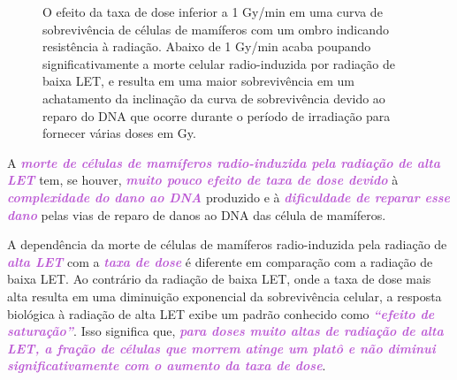 \documentclass[11pt,a4paper]{article}
\begin{document}
	\begin{figure}[h]
		\centering
		\caption{O efeito da taxa de dose inferior a 1 Gy/min em uma curva de sobrevivência de células de mamíferos com um ombro indicando resistência à radiação. Abaixo de 1 Gy/min acaba poupando significativamente a morte celular radio-induzida por radiação de baixa LET, e resulta em uma maior sobrevivência em um achatamento da inclinação da curva de sobrevivência devido ao reparo do DNA que ocorre durante o período de irradiação para fornecer várias doses em Gy.}
		\label{fig:efeitoTaxaDeDose}
	\end{figure}

	A \textcolor{MediumOrchid}{\textbf{\textit{morte de células de mamíferos radio-induzida pela radiação de alta LET}}} tem, se houver, \textcolor{MediumOrchid}{\textbf{\textit{muito pouco efeito de taxa de dose devido}}} à \textcolor{MediumOrchid}{\textbf{\textit{complexidade do dano ao DNA}}} produzido e à \textcolor{MediumOrchid}{\textbf{\textit{dificuldade de reparar esse dano}}} pelas vias de reparo de danos ao DNA das célula de mamíferos.

	A dependência da morte de células de mamíferos radio-induzida pela radiação de \textcolor{MediumOrchid}{\textbf{\textit{alta LET}}} com a \textcolor{MediumOrchid}{\textbf{\textit{taxa de dose}}} é diferente em comparação com a radiação de baixa LET. Ao contrário da radiação de baixa LET, onde a taxa de dose mais alta resulta em uma diminuição exponencial da sobrevivência celular, a resposta biológica à radiação de alta LET exibe um padrão conhecido como \textcolor{MediumOrchid}{\textbf{\textit{``efeito de saturação''}}}. Isso significa que, \textcolor{MediumOrchid}{\textbf{\textit{para doses muito altas de radiação de alta LET, a fração de células que morrem atinge um platô e não diminui significativamente com o aumento da taxa de dose}}}.
\end{document}
